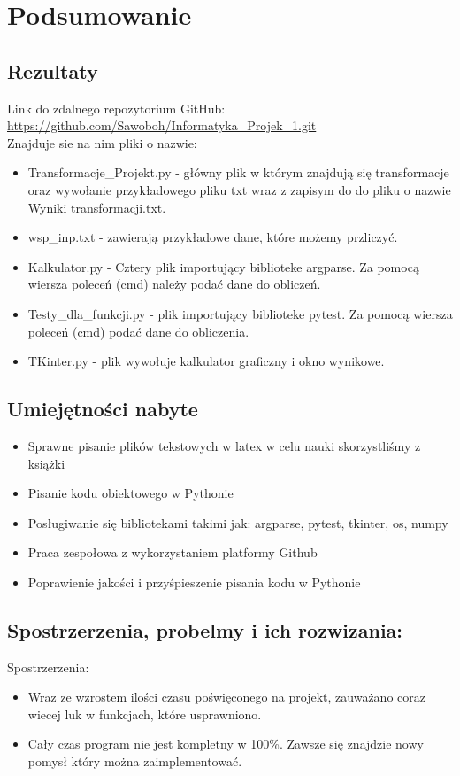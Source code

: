 \section{Podsumowanie}

\subsection{Rezultaty}
Link do zdalnego repozytorium GitHub: \href{https://github.com/Sawoboh/Informatyka_Projek_1.git}{https://github.com/Sawoboh/Informatyka\_{}Projek\_{}1.git} \\
Znajduje sie na nim pliki o nazwie:
\begin{itemize}
\item Transformacje\_{}Projekt.py - główny plik w którym znajdują się transformacje oraz wywołanie przykładowego pliku txt wraz z zapisym do do pliku o nazwie Wyniki transformacji.txt.
\item wsp\_{}inp.txt - zawierają przykładowe dane, które możemy przliczyć. 
\item Kalkulator.py -  Cztery plik importujący biblioteke argparse. Za pomocą wiersza poleceń (cmd) należy  podać dane do obliczeń.
\item Testy\_{}dla\_{}funkcji.py - plik importujący biblioteke pytest. Za pomocą wiersza poleceń (cmd) podać dane do obliczenia.
\item TKinter.py - plik wywołuje kalkulator graficzny i okno wynikowe. 
\end{itemize}

\subsection{Umiejętności nabyte}
\begin{itemize}
	\item Sprawne pisanie plików tekstowych w latex w celu nauki skorzystliśmy z książki \citep{Borkowski.Przybylski2015}
	\item Pisanie kodu obiektowego w Pythonie 
	\item Posługiwanie się bibliotekami takimi jak: argparse, pytest, tkinter, os, numpy \citep{argparse} \citep{argparse2}
	\item Praca zespołowa z wykorzystaniem platformy Github
	\item Poprawienie jakości i przyśpieszenie pisania kodu w Pythonie
\end{itemize}

\subsection{Spostrzerzenia, probelmy i ich rozwizania:}
Spostrzerzenia:
\begin{itemize}
\item Wraz ze wzrostem ilości czasu poświęconego na projekt, zauważano coraz wiecej luk w funkcjach, które usprawniono.
\item Cały czas program nie jest kompletny w 100\%. Zawsze się znajdzie nowy pomysł który można zaimplementować.
\end{itemize}

